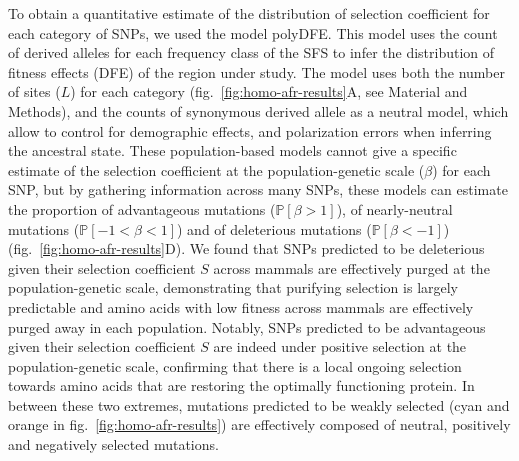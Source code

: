 \documentclass{article}
\newcommand{\proba}{\mathbb{P}}
\newcommand{\Sphy}{S}
\newcommand{\Spop}{\beta}
\newcommand{\polyDel}{\Spop < -1}
\newcommand{\polyNeutral}{-1 < \Spop < 1}
\newcommand{\polyAdv}{ \Spop > 1}
\newcommand{\PpolyDel}{\proba \left[ \polyDel \right]}
\newcommand{\PpolyNeutral}{\proba \left[ \polyNeutral \right]}
\newcommand{\PpolyAdv}{\proba \left[ \polyAdv \right]}
\begin{document}
    To obtain a quantitative estimate of the distribution of selection coefficient for each category of SNPs, we used the model polyDFE\cite{tataru_inference_2017, tataru_polydfe_2020}.
    This model uses the count of derived alleles for each frequency class of the SFS to infer the distribution of fitness effects (DFE) of the region under study.
    The model uses both the number of sites ($L$) for each category (fig.~\ref{fig:homo-afr-results}A, see Material and Methods), and the counts of synonymous derived allele as a neutral model, which allow to control for demographic effects, and polarization errors when inferring the ancestral state.
    These population-based models cannot give a specific estimate of the selection coefficient at the population-genetic scale ($\Spop$) for each SNP, but by gathering information across many SNPs, these models can estimate the proportion of advantageous mutations ($\PpolyAdv$), of nearly-neutral mutations ($\PpolyNeutral$) and of deleterious mutations ($\PpolyDel$) (fig.~\ref{fig:homo-afr-results}D).
    We found that SNPs predicted to be deleterious given their selection coefficient $\Sphy$ across mammals are effectively purged at the population-genetic scale, demonstrating that purifying selection is largely predictable and amino acids with low fitness across mammals are effectively purged away in each population.
    Notably, SNPs predicted to be advantageous given their selection coefficient $\Sphy$ are indeed under positive selection at the population-genetic scale, confirming that there is a local ongoing selection towards amino acids that are restoring the optimally functioning protein.
    In between these two extremes, mutations predicted to be weakly selected (cyan and orange in fig.~\ref{fig:homo-afr-results}) are effectively composed of neutral, positively and negatively selected mutations.
\end{document}
